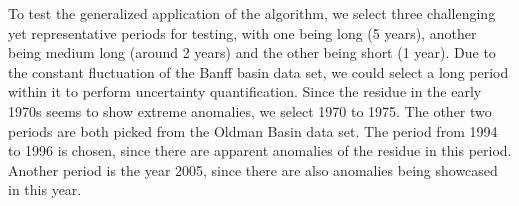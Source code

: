 To test the generalized application of the algorithm, we select three challenging yet representative periods for testing, with one being long (5 years), another being medium long (around 2 years) and the other being short (1 year). Due to the constant fluctuation of the Banff basin data set, we could select a long period within it to perform uncertainty quantification. Since the residue in the early 1970s seems to show extreme anomalies, we select 1970 to 1975. The other two periods are both picked from the Oldman Basin data set. The period from 1994 to 1996 is chosen, since there are apparent anomalies of the residue in this period. Another period is the year 2005, since there are also anomalies being showcased in this year.
